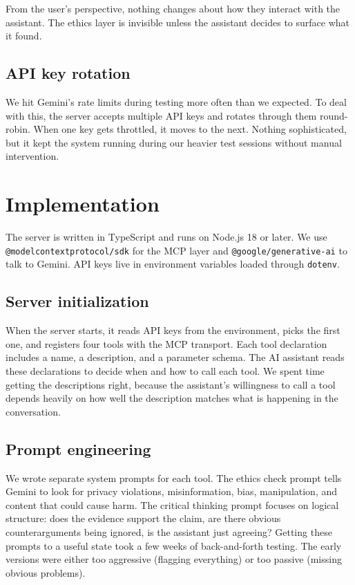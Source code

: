 \documentclass[conference]{IEEEtran}
\begin{document}
From the user's perspective, nothing changes about how they interact with the assistant. The ethics layer is invisible unless the assistant decides to surface what it found.

\subsection{API key rotation}

We hit Gemini's rate limits during testing more often than we expected. To deal with this, the server accepts multiple API keys and rotates through them round-robin. When one key gets throttled, it moves to the next. Nothing sophisticated, but it kept the system running during our heavier test sessions without manual intervention.

\section{Implementation}

The server is written in TypeScript and runs on Node.js 18 or later. We use \texttt{@modelcontextprotocol/sdk} for the MCP layer and \texttt{@google/generative-ai} to talk to Gemini. API keys live in environment variables loaded through \texttt{dotenv}.

\subsection{Server initialization}

When the server starts, it reads API keys from the environment, picks the first one, and registers four tools with the MCP transport. Each tool declaration includes a name, a description, and a parameter schema. The AI assistant reads these declarations to decide when and how to call each tool. We spent time getting the descriptions right, because the assistant's willingness to call a tool depends heavily on how well the description matches what is happening in the conversation.

\subsection{Prompt engineering}

We wrote separate system prompts for each tool. The ethics check prompt tells Gemini to look for privacy violations, misinformation, bias, manipulation, and content that could cause harm. The critical thinking prompt focuses on logical structure: does the evidence support the claim, are there obvious counterarguments being ignored, is the assistant just agreeing? Getting these prompts to a useful state took a few weeks of back-and-forth testing. The early versions were either too aggressive (flagging everything) or too passive (missing obvious problems).
\end{document}
